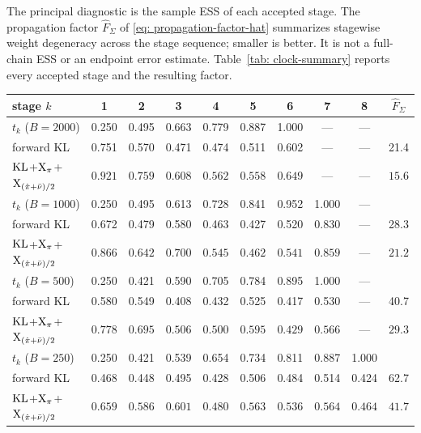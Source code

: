 \documentclass{article}
\begin{document}
The principal diagnostic is the sample ESS of each accepted stage. The propagation factor $\hat F_\Sigma$ of \eqref{eq: propagation-factor-hat} summarizes stagewise weight degeneracy across the stage sequence; smaller is better. It is not a full-chain ESS or an endpoint error estimate. Table~\ref{tab: clock-summary} reports every accepted stage and the resulting factor.

\begin{table}[htb]
    \centering
    \begin{tabular}{lccccccccc}
        \toprule
        stage $k$ & 1 & 2 & 3 & 4 & 5 & 6 & 7 & 8 & $\hat F_\Sigma$ \\
        \midrule
        $t_k$ ($B=2000$) & 0.250 & 0.495 & 0.663 & 0.779 & 0.887 & 1.000 & --- & --- & \\
        forward KL & 0.751 & 0.570 & 0.471 & 0.474 & 0.511 & 0.602 & --- & --- & 21.4 \\
        $\mathrm{KL}$+$\mathrm{X}_\pi$+$\mathrm{X}_{(\hat\pi+\bar\nu)/2}$ & $\mathbf{0.921}$ & $\mathbf{0.759}$ & $\mathbf{0.608}$ & $\mathbf{0.562}$ & $\mathbf{0.558}$ & $\mathbf{0.649}$ & --- & --- & $\mathbf{15.6}$ \\
        \midrule
        $t_k$ ($B=1000$) & 0.250 & 0.495 & 0.613 & 0.728 & 0.841 & 0.952 & 1.000 & --- & \\
        forward KL & 0.672 & 0.479 & 0.580 & 0.463 & 0.427 & 0.520 & 0.830 & --- & 28.3 \\
        $\mathrm{KL}$+$\mathrm{X}_\pi$+$\mathrm{X}_{(\hat\pi+\bar\nu)/2}$ & $\mathbf{0.866}$ & $\mathbf{0.642}$ & $\mathbf{0.700}$ & $\mathbf{0.545}$ & $\mathbf{0.462}$ & $\mathbf{0.541}$ & $\mathbf{0.859}$ & --- & $\mathbf{21.2}$ \\
        \midrule
        $t_k$ ($B=500$) & 0.250 & 0.421 & 0.590 & 0.705 & 0.784 & 0.895 & 1.000 & --- & \\
        forward KL & 0.580 & 0.549 & 0.408 & 0.432 & 0.525 & 0.417 & 0.530 & --- & 40.7 \\
        $\mathrm{KL}$+$\mathrm{X}_\pi$+$\mathrm{X}_{(\hat\pi+\bar\nu)/2}$ & $\mathbf{0.778}$ & $\mathbf{0.695}$ & $\mathbf{0.506}$ & $\mathbf{0.500}$ & $\mathbf{0.595}$ & $\mathbf{0.429}$ & $\mathbf{0.566}$ & --- & $\mathbf{29.3}$ \\
        \midrule
        $t_k$ ($B=250$) & 0.250 & 0.421 & 0.539 & 0.654 & 0.734 & 0.811 & 0.887 & 1.000 & \\
        forward KL & 0.468 & 0.448 & 0.495 & 0.428 & 0.506 & 0.484 & 0.514 & 0.424 & 62.7 \\
        $\mathrm{KL}$+$\mathrm{X}_\pi$+$\mathrm{X}_{(\hat\pi+\bar\nu)/2}$ & $\mathbf{0.659}$ & $\mathbf{0.586}$ & $\mathbf{0.601}$ & $\mathbf{0.480}$ & $\mathbf{0.563}$ & $\mathbf{0.536}$ & $\mathbf{0.564}$ & $\mathbf{0.464}$ & $\mathbf{41.7}$ \\

\end{tabular}
\end{table}
\end{document}
